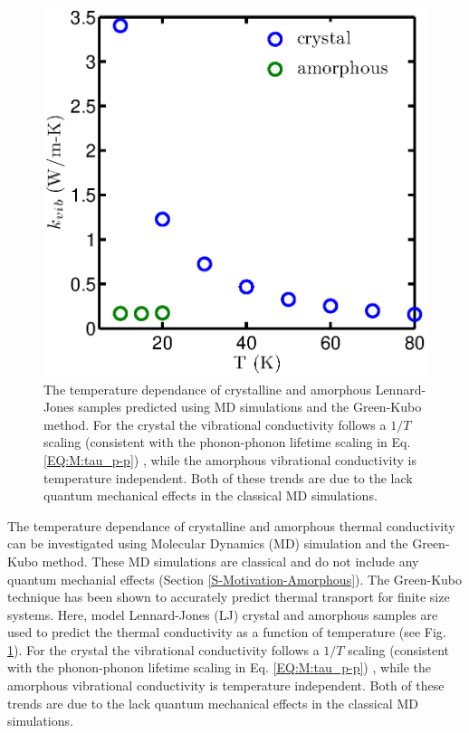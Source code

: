 \documentclass[letterpaper,12pt]{article}
\begin{document}
\begin{figure}
\begin{center}
\includegraphics[scale=0.5]{LJ_amor_GK.eps}
\vspace*{-5mm}
\end{center}
\caption{\label{FIG:LJ_amor_GK}The temperature dependance of crystalline and amorphous Lennard-Jones samples predicted using MD simulations and the Green-Kubo method.\cite{mcgaughey2004a} For the crystal the vibrational conductivity follows a $1/T$ scaling (consistent with the phonon-phonon lifetime scaling in Eq$.$ \eqref{EQ:M:tau_p-p}) , while the amorphous vibrational conductivity is temperature independent.  Both of these trends are due to the lack quantum mechanical effects in the classical MD simulations. }
\end{figure}

The temperature dependance of crystalline and amorphous thermal conductivity can be investigated using Molecular Dynamics (MD) simulation and the Green-Kubo method.\cite{mcgaughey2004a} These MD simulations are classical and do not include any quantum mechanial effects (Section \ref{S-Motivation-Amorphous}). The Green-Kubo technique has been shown to accurately predict thermal transport for finite size systems.\cite{mcgaughey2004a} Here, model Lennard-Jones (LJ) crystal and amorphous samples are used to predict the thermal conductivity as a function of temperature (see Fig. 
\ref{FIG:LJ_amor_GK}).\cite{mcgaughey2004a}  For the crystal the vibrational conductivity follows a $1/T$ scaling (consistent with the phonon-phonon lifetime scaling in Eq$.$ \eqref{EQ:M:tau_p-p}) , while the amorphous vibrational conductivity is temperature independent.  Both of these trends are due to the lack quantum mechanical effects in the classical MD simulations.
\end{document}
